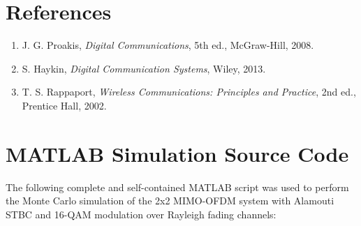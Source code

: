\documentclass[a4paper]{article}
\begin{document}
\section{References}
\begin{enumerate}
    \item J. G. Proakis, \textit{Digital Communications}, 5th ed., McGraw-Hill, 2008.
    \item S. Haykin, \textit{Digital Communication Systems}, Wiley, 2013.
    \item T. S. Rappaport, \textit{Wireless Communications: Principles and Practice}, 2nd ed., Prentice Hall, 2002.
\end{enumerate}

\newpage
\appendix
\section{MATLAB Simulation Source Code}
The following complete and self-contained MATLAB script was used to perform the Monte Carlo simulation of the 2x2 MIMO-OFDM system with Alamouti STBC and 16-QAM modulation over Rayleigh fading channels:
\end{document}
